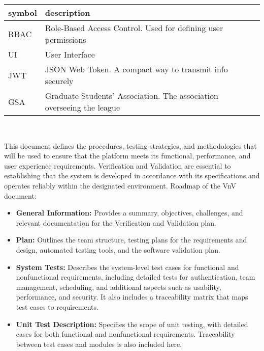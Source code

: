 \documentclass[12pt, titlepage]{article}
\begin{document}
\renewcommand{\arraystretch}{1.2}
\begin{tabular}{l l}
  \toprule
  \textbf{symbol} & \textbf{description}                                                  \\
  \midrule
  RBAC            & Role-Based Access Control. Used for defining user permissions         \\
  UI              & User Interface                                                        \\
  JWT             & JSON Web Token. A compact way to transmit info securely               \\
  GSA             & Graduate Students' Association. The association overseeing the league \\
  \bottomrule
\end{tabular}\\

\newpage



This document defines the procedures, testing strategies, and methodologies that will be used to ensure that the platform meets its functional, performance, and user experience requirements. Verification and Validation are essential to establishing that the system is developed in accordance with its specifications and operates reliably within the designated environment.
Roadmap of the VnV document:
\begin{itemize}
  \item \textbf{General Information:} Provides a summary, objectives, challenges, and relevant documentation for the Verification and Validation plan.
  \item \textbf{Plan:} Outlines the team structure, testing plans for the requirements and design, automated testing tools, and the software validation plan.
  \item \textbf{System Tests:} Describes the system-level test cases for functional and nonfunctional requirements, including detailed tests for authentication, team management, scheduling, and additional aspects such as usability, performance, and security. It also includes a traceability matrix that maps test cases to requirements.
  \item \textbf{Unit Test Description:} Specifies the scope of unit testing, with detailed cases for both functional and nonfunctional requirements. Traceability between test cases and modules is also included here.
\end{itemize}
\end{document}

